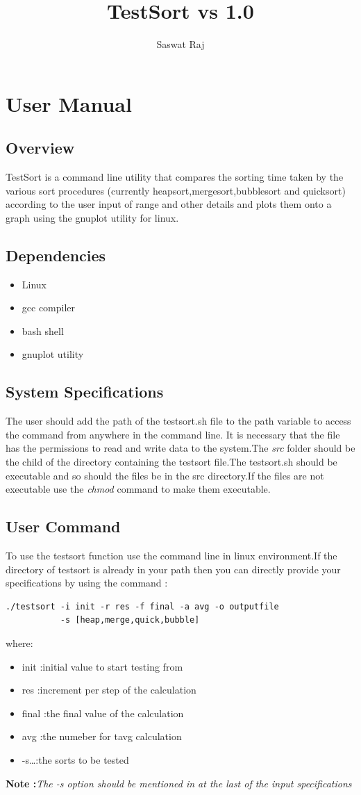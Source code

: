 \documentclass[a4paper,11pt]{article}
\title{TestSort vs 1.0}
\author{Saswat Raj}
\begin{document}
\maketitle
\newpage
\section{User Manual}
\subsection{Overview} TestSort is a command line utility that compares the sorting time taken by the various sort procedures (currently heapsort,mergesort,bubblesort and quicksort) according to the user input of range and other details and plots them onto a graph using the gnuplot utility for linux.
\subsection{Dependencies}
\begin{itemize}
\item Linux 
\item gcc compiler 
\item bash shell
\item gnuplot utility
\end{itemize}
\subsection{System Specifications} The user should add the path of the testsort.sh file to the path variable to access the command from anywhere in the command line. It is necessary that the file has the permissions to read and write data to the system.The \emph{src} folder should be the child of the directory containing the testsort file.The testsort.sh should be executable and so should the files be in the src directory.If the files are not executable use the \emph{chmod} command to make them executable.
\subsection{User Command} To use the testsort function use the command line in linux environment.If the directory of testsort is already in your path then you can directly provide your specifications by using the command :\begin{verbatim}
./testsort -i init -r res -f final -a avg -o outputfile 
           -s [heap,merge,quick,bubble]
\end{verbatim}
where:\begin{itemize}
\item init :initial value to start testing from
\item res :increment per step of the calculation
\item final :the final value of the calculation
\item avg :the numeber for tavg calculation
\item -s\ldots :the sorts to be tested
\end{itemize}
\textbf{Note :}\emph{The -s option should be mentioned in at the last of the input specifications}
\newpage
\end{document}
